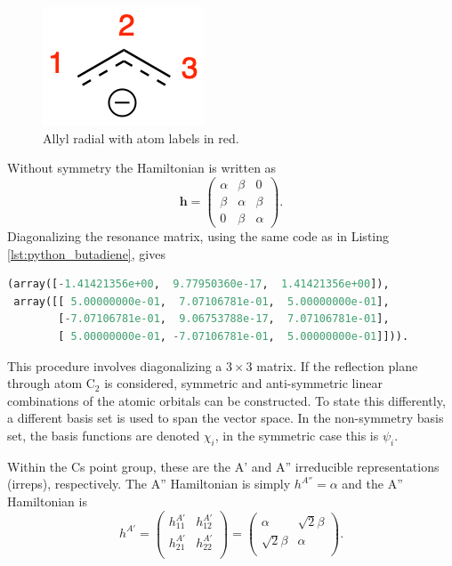 \documentclass{article}
\begin{document}
\begin{figure}[h]
\centering
\includegraphics[scale=1.0]{./images/allyl_labels.png}
\caption{Allyl radial with atom labels in red.}
\label{fig:allyl}
\end{figure} 

Without symmetry the Hamiltonian is written as
%
\begin{equation}
\boldsymbol{h} =
\begin{pmatrix}
\alpha & \beta & 0 \\
\beta & \alpha & \beta \\
0 & \beta & \alpha
\end{pmatrix}.
\end{equation}
%
Diagonalizing the resonance matrix, using the same code as in Listing \ref{lst:python_butadiene}, gives
%
\begin{lstlisting}[language=Python]
(array([-1.41421356e+00,  9.77950360e-17,  1.41421356e+00]),
 array([[ 5.00000000e-01,  7.07106781e-01,  5.00000000e-01],
        [-7.07106781e-01,  9.06753788e-17,  7.07106781e-01],
        [ 5.00000000e-01, -7.07106781e-01,  5.00000000e-01]])).
\end{lstlisting}
%
This procedure involves diagonalizing a $3 \times 3$ matrix. If the reflection plane through atom C$_2$ is considered, symmetric and anti-symmetric linear combinations of the atomic orbitals can be constructed. To state this differently, a different basis set is used to span the vector space. In the non-symmetry basis set, the basis functions are denoted $\chi_i$, in the symmetric case this is $\psi_i$.

Within the Cs point group, these are the A' and A'' irreducible representations (irreps), respectively. The A'' Hamiltonian is simply $h^{A''} = \alpha$ and the A'' Hamiltonian is
%
\begin{equation}
h^{A'} = 
\begin{pmatrix}
h_{11}^{A'} & h_{12}^{A'} \\
h_{21}^{A'} & h_{22}^{A'} \\
\end{pmatrix}
=
\begin{pmatrix}
\alpha & \sqrt{2}\beta \\
\sqrt{2}\beta & \alpha \\
\end{pmatrix}.
\end{equation}
%
\end{document}
